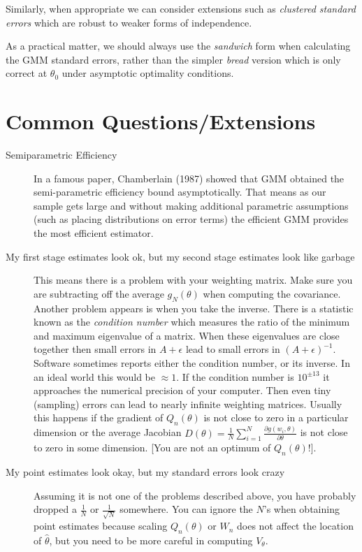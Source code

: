 \documentclass[a4paper]{article}
\begin{document}
Similarly, when appropriate we can consider extensions such as \textit{clustered standard errors} which are robust to weaker forms of independence.

As a practical matter, we should always use the \textit{sandwich} form when calculating the GMM standard errors, rather than the simpler \textit{bread} version which is only correct at $\theta_0$ under asymptotic optimality conditions.


\section*{\normalsize  Common Questions/Extensions}
\begin{description}
\item[Semiparametric Efficiency] In a famous paper, Chamberlain (1987) showed that GMM obtained the semi-parametric efficiency bound asymptotically. That means as our sample gets large and without making additional parametric assumptions (such as placing distributions on error terms) the efficient GMM provides the most efficient estimator.
\item[My first stage estimates look ok, but my second stage estimates look like garbage] This means there is a problem with your weighting matrix. Make sure you are subtracting off the average $g_N(\theta)$ when computing the covariance. Another problem appears is when you take the inverse. There is a statistic known as the \textit{condition number} which measures the ratio of the minimum and maximum eigenvalue of a matrix. When these eigenvalues are close together then small errors in $A+\epsilon$ lead to small errors in $(A+\epsilon)^{-1}$. Software sometimes reports either the condition number, or its inverse. In an ideal world this would be $\approx 1$. If the condition number is $10^{\pm 13}$ it approaches the numerical precision of your computer. Then even tiny (sampling) errors can lead to nearly infinite weighting matrices. Usually this happens if the gradient of $Q_n(\theta)$ is not close to zero in a particular dimension or the average Jacobian $D(\theta)=\frac{1}{N} \sum_{i=1}^N \frac{\partial g(w_i,\theta)}{\partial \theta}$ is not close to zero in some dimension. [You are not an optimum of $Q_n(\theta)$!].
\item[My point estimates look okay, but my standard errors look crazy] Assuming it is not one of the problems described above, you have probably dropped a $\frac{1}{N}$ or $\frac{1}{\sqrt{N}}$ somewhere. You can ignore the $N$'s when obtaining point estimates because scaling $Q_n(\theta)$ or $W_n$ does not affect the location of $\hat{\theta}$, but you need to be more careful in computing $V_{\theta}$.

\end{description}
\end{document}
